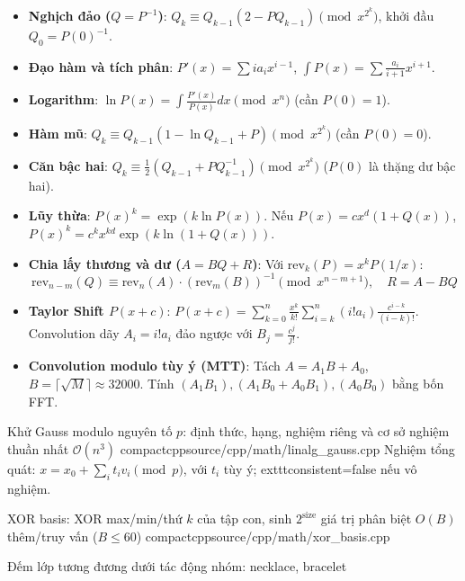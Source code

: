 \begin{itemize}
    \item \textbf{Nghịch đảo ($Q=P^{-1}$)}: $Q_k \equiv Q_{k-1}(2 - P Q_{k-1}) \pmod{x^{2^k}}$, khởi đầu $Q_0 = P(0)^{-1}$.
    \item \textbf{Đạo hàm và tích phân}: $P'(x) = \sum i a_i x^{i-1}$, $\int P(x) = \sum \frac{a_i}{i+1} x^{i+1}$.
    \item \textbf{Logarithm}: $\ln P(x) = \int \frac{P'(x)}{P(x)} dx \pmod{x^n}$ (cần $P(0) = 1$).
    \item \textbf{Hàm mũ}: $Q_k \equiv Q_{k-1}(1 - \ln Q_{k-1} + P) \pmod{x^{2^k}}$ (cần $P(0) = 0$).
    \item \textbf{Căn bậc hai}: $Q_k \equiv \frac{1}{2}(Q_{k-1} + P Q_{k-1}^{-1}) \pmod{x^{2^k}}$ ($P(0)$ là thặng dư bậc hai).
    \item \textbf{Lũy thừa}: $P(x)^k = \exp(k \ln P(x))$. Nếu $P(x) = c x^d (1 + Q(x))$, $P(x)^k = c^k x^{k d} \exp(k \ln(1 + Q(x)))$.
    \item \textbf{Chia lấy thương và dư ($A = BQ + R$)}: Với $\text{rev}_k(P) = x^k P(1/x)$:
    $$\text{rev}_{n-m}(Q) \equiv \text{rev}_n(A) \cdot (\text{rev}_m(B))^{-1} \pmod{x^{n-m+1}}, \quad R = A - BQ$$
    \item \textbf{Taylor Shift $P(x + c)$}: $P(x + c) = \sum_{k=0}^n \frac{x^k}{k!} \sum_{i=k}^n (i! a_i) \frac{c^{i-k}}{(i-k)!}$. Convolution dãy $A_i=i!a_i$ đảo ngược với $B_j = \frac{c^j}{j!}$.
    \item \textbf{Convolution modulo tùy ý (MTT)}: Tách $A=A_1B+A_0$, $B= \lceil\sqrt{M}\rceil \approx 32000$. Tính $(A_1B_1),(A_1B_0+A_0B_1),(A_0B_0)$ bằng bốn FFT.
\end{itemize}

{Khử Gauss modulo nguyên tố $p$: định thức, hạng, nghiệm riêng và cơ sở nghiệm thuần nhất}
{$\mathcal{O}(n^3)$}
{compactcpp}{source/cpp/math/linalg_gauss.cpp}
Nghiệm tổng quát: $x=x_0+\sum_i t_i v_i\pmod p$, với $t_i$ tùy ý; 	exttt{consistent=false} nếu vô nghiệm.

{XOR basis: XOR max/min/thứ $k$ của tập con, sinh $2^{\text{size}}$ giá trị phân biệt}
{$O(B)$ thêm/truy vấn ($B \le 60$)}
{compactcpp}{source/cpp/math/xor_basis.cpp}

{Đếm lớp tương đương dưới tác động nhóm: necklace, bracelet}
{}
{}{}

